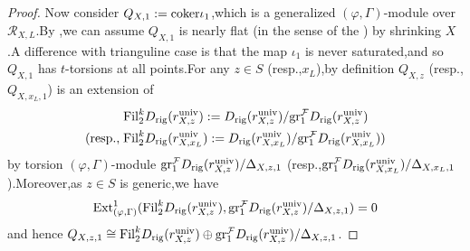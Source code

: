 \documentclass[SecEq,CM,GP]{degruyter-crelle} %
\theoremstyle{plain}
\newcommand{\cokerr}{\rm coker}
\newcommand{\ext}{{\rm Ext}}
\newcommand{\fil}{{\rm Fil}}
\newcommand{\gr}{{\rm gr}}
\newcommand{\rig}{{\rm rig}}
\newcommand{\univer}{{\rm univ}}
\newcommand{\cR}{\mathcal R}
\newcommand{\cF}{\mathcal F}
\begin{document}
\begin{proof}
Now consider $Q_{X,1}:=\cokerr \iota_1$,\;which is a generalized $(\varphi,\Gamma)$-module over $\cR_{X,L}$.\;By \cite[Lemma 5.4 (b)]{bergdall_2017},\;we can assume $Q_{X,1}$ is nearly flat (in the sense of the \cite[Definition  4.1]{bergdall_2017}) by shrinking $X$.\;A difference with trianguline case is that the map $\iota_1$ is never saturated,\;and so $Q_{X,1}$ has $t$-torsions at all points.\;For any $z\in S$ (resp.,\;$x_L$),\;by definition $Q_{X,z}$ (resp.,\;$Q_{X,x_L,1}$) is an extension of
\begin{equation}
	\begin{aligned}
		&\fil_2^kD_{\rig}(r^{\univer}_{X,z}):=D_{\rig}(r^{\univer}_{X,z})/\gr_1^{\cF}D_{\rig}(r^{\univer}_{X,z})\;\\
		(\text{resp.},\;&\fil_2^kD_{\rig}(r^{\univer}_{X,x_L}):=D_{\rig}(r^{\univer}_{X,x_L})/\gr_1^{\cF}D_{\rig}(r^{\univer}_{X,x_L}))
	\end{aligned}
\end{equation}
by torsion $(\varphi,\Gamma)$-module $\gr_1^{\cF}D_{\rig}(r^{\univer}_{X,z})/\Delta_{X,z,1}$ (resp.,\;$\gr_1^{\cF}D_{\rig}(r^{\univer}_{X,x_L})/\Delta_{X,x_L,1}$).\;Moreover,\;as $z\in S$ is generic,\;we have  $$\ext^1_{(\varphi,\Gamma)}(\fil_2^kD_{\rig}(r^{\univer}_{X,z}),\gr_1^{\cF}D_{\rig}(r^{\univer}_{X,z})/\Delta_{X,z,1})=0$$ and hence $Q_{X,z,1}\cong \fil_2^kD_{\rig}(r^{\univer}_{X,z})\oplus \gr_1^{\cF}D_{\rig}(r^{\univer}_{X,z})/\Delta_{X,z,1}$.\;


\end{proof}
\end{document}
